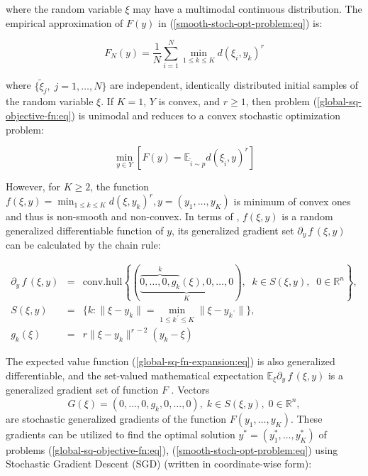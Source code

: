\noindent where the random variable $\xi$ may have a multimodal continuous distribution. The empirical approximation of $F(y)$ in (\ref{smooth-stoch-opt-problem:eq}) is:

\begin{equation}
    \label{empirical-stoch-fn-expansion:eq}
        F_N(y) = \frac{1}{N} \sum_{i=1}^N \min_{1 \leq k \leq K} d(\xi_i, y_k)^r
\end{equation}

\noindent where $\{\tilde{\xi}_j,\; j = 1, \ldots, N\}$ are independent, identically distributed initial samples of the random variable $\xi$. If $K = 1$, $Y$ is convex, and $r\geq 1$, then problem (\ref{global-sq-objective-fn:eq}) is unimodal and reduces to a convex stochastic optimization problem:

\begin{equation}
    \label{convex-stoch-opt-problem:eq}
        \min_{y \in Y} [ F(y) =  \mathbb{E}_{\tilde{i} \sim p} d(\xi_{\tilde{i}}, y)^r ]
\end{equation}

However, for $K \geq 2$, the function $f(\xi, y) = \min_{1 \leq k \leq K} d(\xi, y_k)^r, y = (y_1, \ldots, y_K)$ is minimum of convex ones and thus is non-smooth and non-convex. In terms of \cite{mikhalevich2024,Norkin_1986}, $f(\xi, y)$ is a random generalized differentiable function of $y$, its generalized gradient set $\partial_y \,f\,(\xi,y)$ can be calculated by the chain rule:

\begin{eqnarray}
    \label{sq-objective-fn-gradient:eq}
        \partial_y \,f\,(\xi, y) &=& \text{conv.hull} \left\{ 
				\left(\underbrace{\overbrace{0, \ldots, 0, g_{k}}^k(\xi), 0, \ldots, 0}_K\right), 
				\;\; k \in S(\xi, y), \;\; 0 \in \mathbb{R}^n \right\}, \nonumber \\
        S(\xi, y) &=& \{ k: \| \xi - y_{k} \| = \min_{1 \leq k^{\,\prime} \leq K} \| \xi - y_{k^{\,\prime}} \| \}, \nonumber \\
        g_{k}(\xi) &=& r \| \xi - y_{k} \|^{r \,- 2} (y_{k} - \xi)
\end{eqnarray}

The expected value function (\ref{global-sq-fn-expansion:eq}) is also generalized differentiable, and the set-valued mathematical expectation $\mathbb{E}_{\xi} \partial_y\, f\,(\xi, y)$ is a generalized gradient set of function $F$ \cite{mikhalevich2024,Norkin_1986}. Vectors $$G(\xi) = (0, \ldots, 0, g_k, 0, \ldots, 0), \;k \in S(\xi, y), \;0 \in \mathbb{R}^n,$$ are stochastic generalized gradients of the function $F(y_1, \ldots, y_K)$. These gradients can be utilized to find the optimal solution $y^{*}=(y_1^{*},\ldots,y_K^{*})$ of problems (\ref{global-sq-objective-fn:eq}), (\ref{smooth-stoch-opt-problem:eq}) using Stochastic Gradient Descent (SGD) \cite{Robbins_Monro_1951,kiefer1952stochastic,ermoliev1976stochastic,Norkin_Kozyriev_Norkin_2024} (written in coordinate-wise form):

